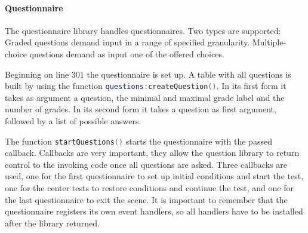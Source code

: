 \paragraph{Questionnaire}
The questionnaire library handles questionnaires.
Two types are supported:
Graded questions demand input in a range of specified granularity.
Multiple-choice questions demand as input one of the offered choices.

Beginning on line 301 the questionnaire is set up.
A table with all questions is built by using the function \lstinline[language=lua]{questions:createQuestion()}.
In its first form it takes as argument a question, the minimal and maximal grade label and the number of grades.
In its second form it takes a question as first argument, followed by a list of possible answers.

The function \lstinline[language=lua]{startQuestions()} starts the questionnaire with the passed callback.
Callbacks are very important, they allow the question library to return control to the invoking code once all questions are asked.
Three callbacks are used, one for the first questionnaire to set up initial conditions and start the test, one for the center tests to restore conditions and continue the test, and one for the last questionnaire to exit the scene.
It is important to remember that the questionnaire registers its own event handlers, so all handlers have to be installed after the library returned.

